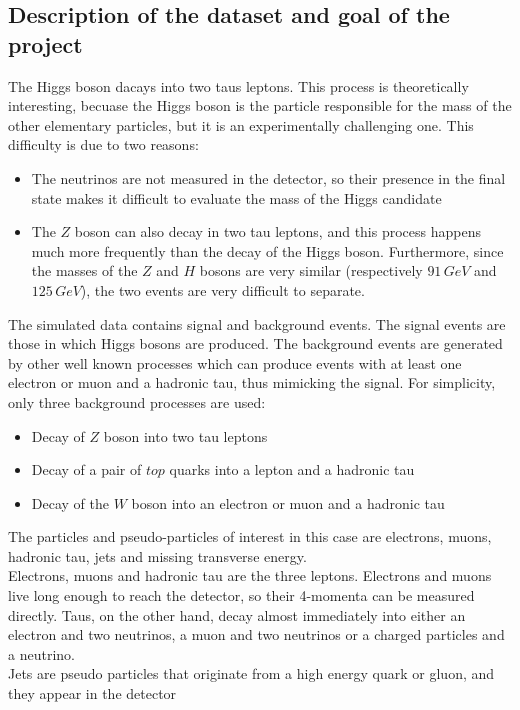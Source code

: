 \documentclass[12pt]{article}
\begin{document}
\subsection{Description of the dataset and goal of the project}
The Higgs boson dacays into two taus leptons. This process is theoretically interesting, becuase the Higgs 
boson is the particle responsible for the mass of the other elementary particles, but it is an experimentally 
challenging one. This difficulty is due to two reasons:
\begin{itemize}
  \item The neutrinos are not measured in the detector, so their presence in the final state makes it 
	difficult to evaluate the mass of the Higgs candidate
  \item The $Z$ boson can also decay in two tau leptons, and this process happens much more frequently than 
	the decay of the Higgs boson. Furthermore, since the masses of the $Z$ and $H$ bosons are very similar 
	(respectively $91\,GeV$ and $125\,GeV$), the two events are very difficult to separate.
\end{itemize}
The simulated data \cite{CERNOpenDataHiggsML} contains signal and background events. The signal events are those in which Higgs bosons
are produced. The background events are generated by other well known processes which can produce events with 
at least one electron or muon and a hadronic tau, thus mimicking the signal. For simplicity, only three
background processes are used:
\begin{itemize}
  \item Decay of $Z$ boson into two tau leptons
  \item Decay of a pair of $top$ quarks into a lepton and a hadronic tau
  \item Decay of the $W$ boson into an electron or muon and a hadronic tau
\end{itemize}
The particles and pseudo-particles of interest in this case are electrons, muons, hadronic tau, jets and 
missing transverse energy. \\
Electrons, muons and hadronic tau are the three leptons. Electrons and muons live long enough to reach the 
detector, so their 4-momenta can be measured directly. Taus, on the other hand, decay almost immediately 
into either an electron and two neutrinos, a muon and two neutrinos or a charged particles and a neutrino. \\
Jets are pseudo particles that originate from a high energy quark or gluon, and they appear in the detector 
\end{document}
